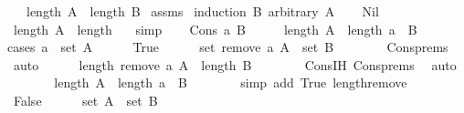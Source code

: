 \begin{isabellebody}
\ \ \ {\isachardoublequoteopen}length\ A\ {\isasymle}\ length\ B{\isachardoublequoteclose}\isanewline
%
\isadelimproof
%
\endisadelimproof
%
\isatagproof
{}\isamarkupfalse%
\ assms\ \isamarkupfalse%
{\isacharparenleft}induction\ B\ arbitrary{\isacharcolon}\ A{\isacharparenright}\isanewline
\ \ \isamarkupfalse%
\ Nil\isanewline
\ \ \isamarkupfalse%
\ \isamarkupfalse%
\ {\isachardoublequoteopen}length\ A\ {\isasymle}\ length\ {\isacharbrackleft}{\isacharbrackright}{\isachardoublequoteclose}\ \isamarkupfalse%
\ simp\isanewline
{}\isamarkupfalse%
\isanewline
\ \ \isamarkupfalse%
\ {\isacharparenleft}Cons\ a\ B{\isacharparenright}\isanewline
\ \ \isamarkupfalse%
\ \isamarkupfalse%
\ {\isachardoublequoteopen}length\ A\ {\isasymle}\ length\ {\isacharparenleft}a\ {\isacharhash}\ B{\isacharparenright}{\isachardoublequoteclose}\isanewline
\ \ \isamarkupfalse%
{\isacharparenleft}cases\ {\isachardoublequoteopen}a\ {\isasymin}\ set\ A{\isachardoublequoteclose}{\isacharparenright}\isanewline
\ \ \ \ \isamarkupfalse%
\ True\isanewline
\ \ \ \ \isamarkupfalse%
\ {\isachardoublequoteopen}set\ {\isacharparenleft}remove{}\ a\ A{\isacharparenright}\ {\isasymsubseteq}\ set\ B{\isachardoublequoteclose}\isanewline
\ \ \ \ \ \ \isamarkupfalse%
\ Cons{\isachardot}prems\ \isamarkupfalse%
\ auto\isanewline
\ \ \ \ \isamarkupfalse%
\ {\isachardoublequoteopen}length\ {\isacharparenleft}remove{}\ a\ A{\isacharparenright}\ {\isasymle}\ length\ B{\isachardoublequoteclose}\isanewline
\ \ \ \ \ \ \isamarkupfalse%
\ Cons{\isachardot}IH\ Cons{\isachardot}prems\ \isamarkupfalse%
\ auto\isanewline
\ \ \ \ \isamarkupfalse%
\ \isamarkupfalse%
\ {\isachardoublequoteopen}length\ A\ {\isasymle}\ length\ {\isacharparenleft}a\ {\isacharhash}\ B{\isacharparenright}{\isachardoublequoteclose}\isanewline
\ \ \ \ \ \ \isamarkupfalse%
\ {\isacharparenleft}simp\ add{\isacharcolon}\ True\ length{\isacharunderscore}remove{}{\isacharparenright}\isanewline
\ \ \isamarkupfalse%
\isanewline
\ \ \ \ \isamarkupfalse%
\ False\isanewline
\ \ \ \ \isamarkupfalse%
\ {\isachardoublequoteopen}set\ A\ {\isasymsubseteq}\ set\ B{\isachardoublequoteclose}\isanewline
\ \ \ \ \ \ \isamarkupfalse%

\end{isabellebody}
